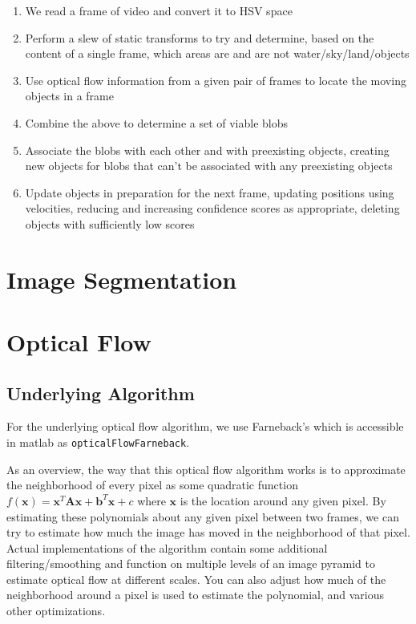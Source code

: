 \documentclass{article}
\begin{document}
\begin{enumerate}
\item We read a frame of video and convert it to HSV space
\item Perform a slew of static transforms to try and determine,
      based on the content of a single frame, which areas are and
      are not water/sky/land/objects
\item Use optical flow information from a given pair of frames to
      locate the moving objects in a frame
\item Combine the above to determine a set of viable blobs
\item Associate the blobs with each other and with preexisting objects,
      creating new objects for blobs that can't be associated with any
      preexisting objects
\item Update objects in preparation for the next frame, updating
      positions using velocities, reducing and increasing confidence
      scores as appropriate, deleting objects with sufficiently low
      scores
\end{enumerate}

\section{Image Segmentation}

\section{Optical Flow}

\subsection{Underlying Algorithm}

For the underlying optical flow algorithm, we use Farneback's
\cite{farneback2003} which is accessible in matlab as
\texttt{opticalFlowFarneback}.

As an overview, the way that this optical flow algorithm works is to
approximate the neighborhood of every pixel as some quadratic function
$f(\mathbf{x}) = \mathbf{x}^T \mathbf{A} \mathbf{x} + \mathbf{b}^T \mathbf{x} + c$
where $\mathbf{x}$ is the location around any given pixel. By estimating these
polynomials about any given pixel between two frames, we can try to estimate how
much the image has moved in the neighborhood of that pixel. Actual
implementations of the algorithm contain some additional filtering/smoothing and
function on multiple levels of an image pyramid to estimate optical flow at
different scales. You can also adjust how much of the neighborhood around a
pixel is used to estimate the polynomial, and various other optimizations.
\end{document}
